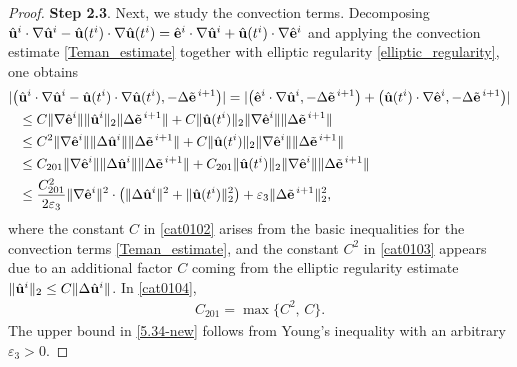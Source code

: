 \documentclass{article}
\theoremstyle{definition}                   %
\begin{document}
\begin{proof}
\vskip 0.2cm
{\bf Step 2.3}. Next, we study the convection terms.
Decomposing
$\hat{\bf u}^i\cdot\nabla\hat{\bf u}^i - \hat{\bf u}(t^i)\cdot\nabla\hat{\bf u}(t^i)
= \hat{\bf e}^i\cdot\nabla\hat{\bf u}^i + \hat{\bf u}(t^i)\cdot\nabla\hat{\bf e}^i$
and applying the convection estimate \eqref{Teman_estimate} together with
elliptic regularity \eqref{elliptic_regularity}, one obtains
\begin{align}
|\bigl(
&\hat{\bf u}^{i} \cdot \nabla \hat{\bf u}^{i}
- \hat{\bf u}(t^{i})\cdot \nabla \hat{\bf u}(t^{i}),
- \Delta \tilde{\bf e}^{\,i+1}\bigr)| =
| \bigl(
\hat{\mathbf e}^{i} \cdot \nabla \hat{\mathbf u}^{i},
- \Delta \tilde{\mathbf e}^{\,i+1}
\bigr)
+
\bigl(
\hat{\mathbf u}(t^{i})\cdot \nabla \hat{\mathbf e}^{i},
- \Delta \tilde{\mathbf e}^{\,i+1}
\bigr) | \notag
\\
&\le
C \|\nabla \hat{\bf e}^{i}\|
\|\hat{\bf u}^{i}\|_{2}
\|\Delta \tilde{\bf e}^{\,i+1}\|
+
C \|\hat{\bf u}(t^{i})\|_{2}
\|\nabla \hat{\bf e}^{i}\|
\|\Delta \tilde{\bf e}^{\,i+1}\|
\label{cat0102}
\\
&\le
C^2 \|\nabla \hat{\bf e}^{i}\|
\|\Delta \hat{\bf u}^{i}\|
\|\Delta \tilde{\mathbf e}^{\,i+1}\|
+
C \|\hat{\bf u}(t^{i})\|_{2}
\|\nabla \hat{\bf e}^{i}\|
\|\Delta \tilde{\bf e}^{\,i+1}\|
\label{cat0103}
\\
&\le
C_{201} \|\nabla \hat{\bf e}^{i}\|
\|\Delta \hat{\bf u}^{i}\|
\|\Delta \tilde{\mathbf e}^{\,i+1}\|
+
C_{201} \|\hat{\bf u}(t^{i})\|_{2}
\|\nabla \hat{\bf e}^{i}\|
\|\Delta \tilde{\bf e}^{\,i+1}\|
\label{cat0104}
\\
&\le
\frac{C_{201}^2}{2\varepsilon_3} 
\|\nabla \hat{\bf e}^{i}\|^{2}
\cdot \left( \|\Delta \hat{\bf u}^{i}\|^{2}
+
\|\hat{\bf u}(t^{i})\|_2^{2}\right)
+
\varepsilon_3 \|\Delta \tilde{\mathbf e}^{\,i+1}\|_{2}^{2},
\label{5.34-new}
\end{align}
where the constant $C$ in \eqref{cat0102} arises from the basic inequalities
for the convection terms \eqref{Teman_estimate}, and 
the constant $C^2$ in \eqref{cat0103} appears due to an additional factor $C$
coming from the elliptic regularity estimate
$\|\hat{\bf u}^{i}\|_{2} \le C \|\Delta \hat{\bf u}^{i}\|$. 
In \eqref{cat0104}, 
\begin{align}
C_{201} = \max\{C^2,\, C\}.
\label{def_C201}
\end{align}
The upper bound in \eqref{5.34-new} follows from Young’s inequality with an arbitrary
$\varepsilon_3 > 0$.


\end{proof}
\end{document}
